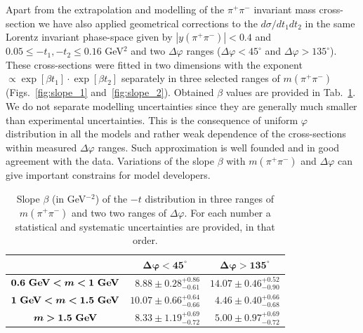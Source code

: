 Apart from the extrapolation and modelling of the $\pi^{+}\pi^{-}$ invariant mass cross-section we have also applied geometrical corrections to the $d\sigma/dt_{1}dt_{2}$ in the same Lorentz invariant phase-space given by $|y(\pi^+\pi^-)|<0.4$ and $0.05 \leq -t_1 , -t_2 \leq 0.16$ GeV$^2$ and two $\Delta\varphi$ ranges ($\Delta\varphi<45^{\circ}$ and $\Delta\varphi>135^{\circ}$). 
These cross-sections were fitted in two dimensions with the exponent $\propto \exp{\left[\beta t_{1}\right]}\cdot\exp{\left[\beta t_{2}\right]}$ separately in three selected ranges of $m(\pi^{+}\pi^{-})$ (Figs.~\ref{fig:slope_1} and~\ref{fig:slope_2}). Obtained $\beta$ values are provided in Tab.~\ref{tab:slopes}. 
We do not separate modelling uncertainties since they are generally much smaller than experimental uncertainties. This is the consequence of uniform $\varphi$ distribution in all the models and rather weak dependence of the cross-sections within measured $\Delta\varphi$ ranges. Such approximation is well founded and in good agreement with the data.
Variations of the slope $\beta$ with $m(\pi^{+}\pi^{-})$ and $\Delta\varphi$ can give important constrains for model developers.%
%

{
\renewcommand{\arraystretch}{1.5}
\begin{table}[b]\centering
\begin{tabular}{c| cc}%
	~ & $\bm{\Delta\varphi<45^{\circ}}$ & $\bm{\Delta\varphi>135^{\circ}}$\\ \hline\hline
	$\bm{0.6~\text{\bf{GeV}} < m <1~\text{\bf{GeV}}}$ & ~$8.88 \pm 0.28 ^{+0.86}_{-0.61}$ & $14.07 \pm 0.46 ^{+0.52}_{-0.90}$\\ %
	$\bm{1~\text{\bf{GeV}} < m < 1.5~\text{\bf{GeV}}}$ & $10.07 \pm 0.66 ^{+0.64}_{-0.66}$ & ~$4.46 \pm 0.40 ^{+0.66}_{-0.68}$\\ %
	$\bm{m>1.5~\text{\bf{GeV}}}$ & ~$8.33 \pm 1.19 ^{+0.69}_{-0.72}$ & ~$5.00 \pm 0.97 ^{+0.69}_{-0.72}$\\ %
\end{tabular}
\caption{Slope $\beta$ (in GeV$^{-2}$) of the $-t$ distribution in three ranges of $m(\pi^{+}\pi^{-})$ and two two ranges of $\Delta\varphi$. For each number a statistical and systematic uncertainties are provided, in that order.}\label{tab:slopes}
\end{table}
}


